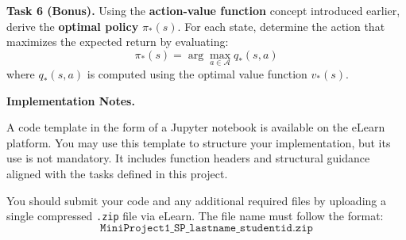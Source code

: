 \documentclass[12pt]{extreport}
\theoremstyle{definition}
\begin{document}
\medskip

\noindent\textbf{Task 6 (Bonus).} Using the \textbf{action-value function} concept introduced earlier, derive the \textbf{optimal policy} \( \pi_*(s) \). For each state, determine the action that maximizes the expected return by evaluating:
\[
\pi_*(s) = \arg\max_{a \in \mathcal{A}} q_*(s,a)
\]
where \( q_*(s,a) \) is computed using the optimal value function \( v_*(s) \).

\bigskip

\noindent\textbf{Implementation Notes.}

\bigskip

\noindent A code template in the form of a Jupyter notebook is available on the eLearn platform. You may use this template to structure your implementation, but its use is not mandatory. It includes function headers and structural guidance aligned with the tasks defined in this project.

\medskip

\noindent You should submit your code and any additional required files by uploading a single compressed \texttt{.zip} file via eLearn. The file name must follow the format:
\[
\texttt{MiniProject1\_SP\_lastname\_studentid.zip}
\]
\end{document}
